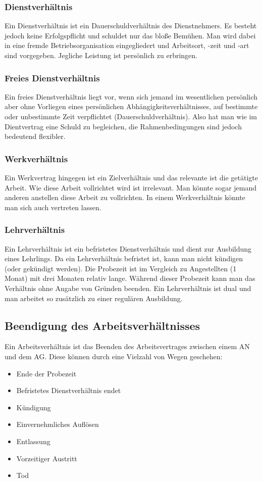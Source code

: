\documentclass{article}
\begin{document}
	\subsubsection{Dienstverhältnis}
	Ein Dienstverhältnis ist ein Dauerschuldverhältnis des Dienstnehmers. Es besteht jedoch keine Erfolgspflicht und schuldet nur das bloße Bemühen. Man wird dabei in eine fremde Betriebsorganisation eingegliedert und Arbeitsort, -zeit und -art sind vorgegeben. Jegliche Leistung ist persönlich zu erbringen.
	\subsubsection{Freies Dienstverhältnis}
	Ein freies Dienstverhältnis liegt vor, wenn sich jemand im wesentlichen persönlich aber ohne Vorliegen eines persönlichen Abhängigkeitsverhältnisses, auf bestimmte oder unbestimmte Zeit verpflichtet (Dauerschuldverhältnis). Also hat man wie im Dientvertrag eine Schuld zu begleichen, die Rahmenbedingungen sind jedoch bedeutend flexibler.
	\subsubsection{Werkverhältnis}
	Ein Werkvertrag hingegen ist ein Zielverhältnis und das relevante ist die getätigte Arbeit. Wie diese Arbeit vollrichtet wird ist irrelevant. Man könnte sogar jemand anderen anstellen diese Arbeit zu vollrichten. In einem Werkverhältnis könnte man sich auch vertreten lassen.
	\subsubsection{Lehrverhältnis}
	Ein Lehrverhältnis ist ein befristetes Dienstverhältnis und dient zur Ausbildung eines Lehrlings. Da ein Lehrverhältnis befristet ist, kann man nicht kündigen (oder gekündigt werden). Die Probezeit ist im Vergleich zu Angestellten (1 Monat) mit drei Monaten relativ lange. Während dieser Probezeit kann man das Verhältnis ohne Angabe von Gründen beenden. Ein Lehrverhältnis ist dual und man arbeitet so zusätzlich zu einer regulären Ausbildung.
	\subsection{Beendigung des Arbeitsverhältnisses}
	Ein Arbeitsverhältnis ist das Beenden des Arbeitsvertrages zwischen einem AN und dem AG. Diese können durch eine Vielzahl von Wegen geschehen:
	\begin{itemize}
		\item{Ende der Probezeit}
		\item{Befristetes Dienstverhältnis endet}
		\item{Kündigung}
		\item{Einvernehmliches Auflösen}
		\item{Entlassung}
		\item{Vorzeitiger Austritt}
		\item{Tod}
	\end{itemize}
\end{document}
